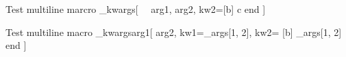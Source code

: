 \documentclass{article}
\author{Macro Kwarg Test}
\begin{document}
	Test multiline marcro \pym\macro_kwargs[
		\ \ arg1, arg2, kw2=[b]
		c end  
	]

	Test multiline macro 
	\pym\macro_kwargs{arg1}[
		arg2, kw1=\pym\emb_args[1, 2],
		kw2=
		[b] 
		\pym\emb_args[1, 2]
		end
	]
\end{document}
